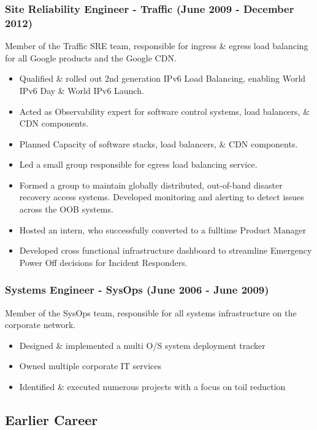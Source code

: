 \documentclass[a4paper, 10pt] {article}
\begin{document}
\subsubsection*{Site Reliability Engineer - Traffic (June 2009 - December 2012)}

Member of the Traffic SRE team, responsible for ingress \& egress load
balancing for all Google products and the Google CDN. 

\begin{itemize}[noitemsep]
  \item Qualified \& rolled out 2nd generation IPv6 Load Balancing, enabling World IPv6 Day \& World IPv6 Launch.
	\item Acted as Observability expert for software control systems, load balancers, \& CDN components.
	\item Planned Capacity of software stacks, load balancers, \& CDN components.
 	\item Led a small group responsible for egress load balancing service.
  	\item Formed a group to maintain globally distributed, out-of-band disaster recovery access systems. Developed monitoring and alerting to
   		detect issues across the OOB systems.
 	\item Hosted an intern, who successfully converted to a fulltime Product Manager
	\item Developed cross functional infrastructure dashboard to streamline Emergency Power Off decisions for Incident Responders.
\end{itemize}

\subsubsection*{Systems Engineer - SysOps (June 2006 - June 2009)}

Member of the SysOps team, responsible for all systems infrastructure on
the corporate network.

\begin{itemize}[noitemsep]
	\item Designed \& implemented a multi O/S system deployment tracker
	\item Owned multiple corporate IT services
	\item Identified \& executed numerous projects with a focus on toil reduction
\end{itemize}

\subsection*{Earlier Career}
\end{document}
